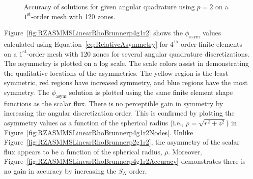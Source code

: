 \documentclass[12pt,letterpaper]{article}
\begin{document}
\begin{figure}[!htb]
\centering
{}
\caption{Accuracy of solutions for given angular quadrature using $p=2$ on a $1^\text{st}$-order mesh with 120 zones.}
\label{fig:RZASMMSLinearRhoBrunnerp2g1r2Accuracy}
\end{figure}

\FloatBarrier

Figure~\ref{fig:RZASMMSLinearRhoBrunnerp4g1r2} shows the $\phi_\text{asym}$ values calculated using Equation~\ref{eq:RelativeAsymmetry} for $4^\text{th}$-order finite elements on a $1^\text{st}$-order mesh with 120 zones for several angular quadrature discretizations. The asymmetry is plotted on a log scale. The scale colors assist in demonstrating the qualitative locations of the asymmetries. The yellow region is the least symmetric, red regions have increased symmetry, and blue regions have the most symmetry. The $\phi_\text{asym}$ solution is plotted using the same finite element shape functions as the scalar flux. There is no perceptible gain in symmetry by increasing the angular discretization order. This is confirmed by plotting the asymmetry values as a function of the spherical radius (i.e., $\rho=\sqrt{r^2+z^2}$) in Figure~\ref{fig:RZASMMSLinearRhoBrunnerp4g1r2Nodes}. Unlike Figure~\ref{fig:RZASMMSLinearRhoBrunnerp2g1r2}, the asymmetry of the scalar flux appears to be a function of the spherical radius, $\rho$. Moreover, Figure~\ref{fig:RZASMMSLinearRhoBrunnerp4g1r2Accuracy} demonstrates there is no gain in accuracy by increasing the $S_N$ order.
\end{document}
